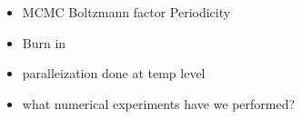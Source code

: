 \begin{itemize}
\item MCMC
  \subitem Boltzmann factor
  \subitem Periodicity
\item Burn in
 \item paralleization done at temp level
 \item what numerical experiments have we performed?
\end{itemize}
